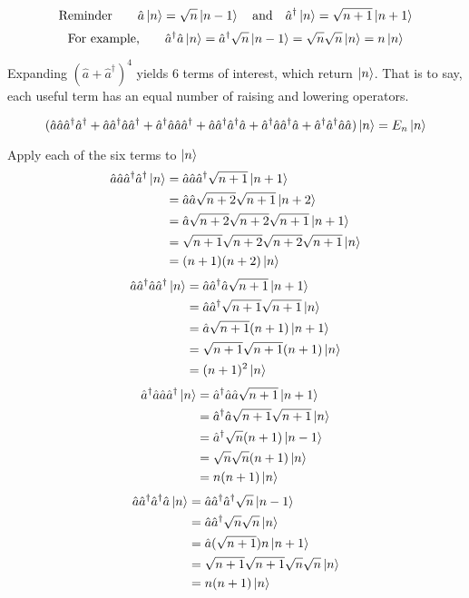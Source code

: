 \documentclass{amsart}
\begin{document}
\[\text{Reminder}\qquad\hat{a}\ket{n} =\sqrt{n}\ket{n-1} \qq{and} \hat{a}^\dagger\ket{n} =\sqrt{n+1}\ket{n+1}  \]
\[\text{For example,}\qquad\hat{a}^\dagger\hat{a}\ket{n} =\hat{a}^\dagger\sqrt{n}\ket{n-1}=\sqrt{n}\sqrt{n}\ket{n}=n\ket{n} \]

Expanding $(\hat{a}+\hat{a}^\dagger)^4$ yields 6 terms of interest, which return $\ket{n}$. That is to say, each useful term has an equal number of raising and lowering operators.

\[(\hat{a}\hat{a}\hat{a}^\dagger\hat{a}^\dagger+\hat{a}\hat{a}^\dagger\hat{a}\hat{a}^\dagger+\hat{a}^\dagger\hat{a}\hat{a}\hat{a}^\dagger+\hat{a}\hat{a}^\dagger\hat{a}^\dagger\hat{a}+\hat{a}^\dagger\hat{a}\hat{a}^\dagger\hat{a}+\hat{a}^\dagger\hat{a}^\dagger\hat{a}\hat{a})\ket{n}=E_n\ket{n}\]

Apply each of the six terms to $\ket{n}$
\begin{align*}
    \hat{a}\hat{a}\hat{a}^\dagger\hat{a}^\dagger\ket{n}&=\hat{a}\hat{a}\hat{a}^\dagger\sqrt{n+1}\ket{n+1}\\
    &=\hat{a}\hat{a}\sqrt{n+2}\sqrt{n+1}\ket{n+2}\\
    &=\hat{a}\sqrt{n+2}\sqrt{n+2}\sqrt{n+1}\ket{n+1}\\
    &=\sqrt{n+1}\sqrt{n+2}\sqrt{n+2}\sqrt{n+1}\ket{n}\\
    &=(n+1)(n+2)\ket{n}
\end{align*}
\begin{align*}
    \hat{a}\hat{a}^\dagger\hat{a}\hat{a}^\dagger\ket{n}&=\hat{a}\hat{a}^\dagger\hat{a}\sqrt{n+1}\ket{n+1}\\
    &=\hat{a}\hat{a}^\dagger\sqrt{n+1}\sqrt{n+1}\ket{n}\\
    &=\hat{a}\sqrt{n+1}(n+1)\ket{n+1}\\
    &=\sqrt{n+1}\sqrt{n+1}(n+1)\ket{n}\\
    &=(n+1)^2\ket{n}
\end{align*}
\begin{align*}
    \hat{a}^\dagger\hat{a}\hat{a}\hat{a}^\dagger\ket{n}&=\hat{a}^\dagger\hat{a}\hat{a}\sqrt{n+1}\ket{n+1}\\
    &=\hat{a}^\dagger\hat{a}\sqrt{n+1}\sqrt{n+1}\ket{n}\\
    &=\hat{a}^\dagger\sqrt{n}(n+1)\ket{n-1}\\
    &=\sqrt{n}\sqrt{n}(n+1)\ket{n}\\
    &=n(n+1)\ket{n}
\end{align*}
\begin{align*}
    \hat{a}\hat{a}^\dagger\hat{a}^\dagger\hat{a}\ket{n}&=\hat{a}\hat{a}^\dagger\hat{a}^\dagger\sqrt{n}\ket{n-1}\\
    &=\hat{a}\hat{a}^\dagger\sqrt{n}\sqrt{n}\ket{n}\\
    &=\hat{a}(\sqrt{n+1})n\ket{n+1}\\
    &=\sqrt{n+1}\sqrt{n+1}\sqrt{n}\sqrt{n}\ket{n}\\
    &=n(n+1)\ket{n}
\end{align*}
\end{document}
